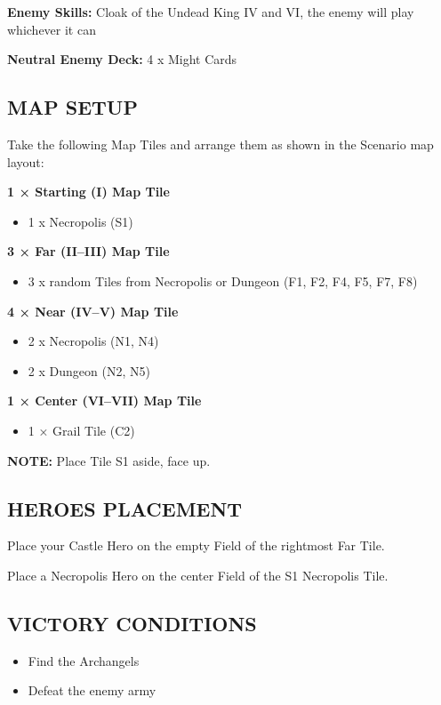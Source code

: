 \begin{multicols*}{2}
\textbf{Enemy Skills:} Cloak of the Undead King IV and VI, the enemy will play whichever it can

\textbf{Neutral Enemy Deck:} 4 x Might Cards

\subsection*{\MakeUppercase{Map setup}}

Take the following Map Tiles and arrange them as shown in the Scenario map layout:

\textbf{1 × Starting (I) Map Tile}
\begin{itemize}
    \item 1 x Necropolis (S1)
\end{itemize}

\textbf{3 × Far (II--III) Map Tile}
\begin{itemize}
    \item 3 x random Tiles from Necropolis or Dungeon (F1, F2, F4, F5, F7, F8)
\end{itemize}

\textbf{4 × Near (IV--V) Map Tile}
\begin{itemize}
    \item 2 x Necropolis (N1, N4)
    \item 2 x Dungeon (N2, N5)
\end{itemize}

\textbf{1 × Center (VI--VII) Map Tile}
\begin{itemize}
  \item 1 × Grail Tile (C2)
\end{itemize}

\textbf{\MakeUppercase{Note:}} Place Tile S1 aside, face up.

\subsection*{\MakeUppercase{Heroes placement}}

Place your Castle Hero on the empty Field of the rightmost Far Tile.

Place a Necropolis Hero on the center Field of the S1 Necropolis Tile.

\subsection*{\MakeUppercase{Victory Conditions}}

\begin{itemize}
  \item Find the Archangels
  \item Defeat the enemy army
\end{itemize}



\end{multicols*}
